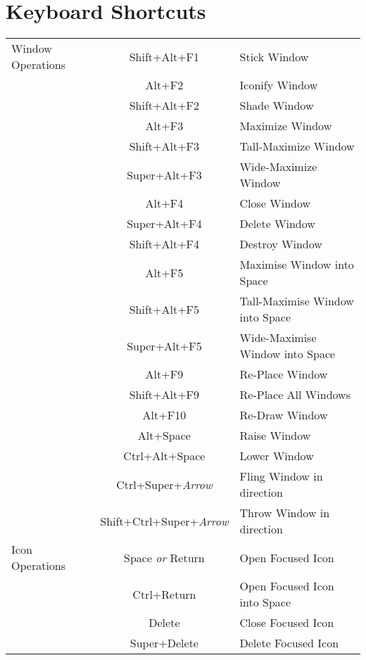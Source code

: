 \documentclass[a4paper,11pt]{article}
\begin{document}
	\section{Keyboard Shortcuts}
		\begin{longtable}{ l c l }
			\toprule
				Window Operations & Shift+Alt+F1 & Stick Window \\ \subrule
				                  & Alt+F2 & Iconify Window \\
				                  & Shift+Alt+F2 & Shade Window \\ \subrule
				                  & Alt+F3 & Maximize Window \\
				                  & Shift+Alt+F3 & Tall-Maximize Window \\
				                  & Super+Alt+F3 & Wide-Maximize Window \\ \subrule
				                  & Alt+F4 & Close Window \\
				                  & Super+Alt+F4 & Delete Window \\
				                  & Shift+Alt+F4 & Destroy Window \\ \subrule
				                  & Alt+F5 & Maximise Window into Space \\
				                  & Shift+Alt+F5 & Tall-Maximise Window into Space \\
				                  & Super+Alt+F5 & Wide-Maximise Window into Space \\ \subrule
				                  & Alt+F9 & Re-Place Window \\
				                  & Shift+Alt+F9 & Re-Place All Windows \\ \subrule
				                  & Alt+F10 & Re-Draw Window \\ \subrule
				                  & Alt+Space & Raise Window \\
				                  & Ctrl+Alt+Space & Lower Window \\ \subrule
				                  & Ctrl+Super+\emph{Arrow} & Fling Window in direction \\
				                  & Shift+Ctrl+Super+\emph{Arrow} & Throw Window in direction \\
			\midrule
				Icon Operations & Space \emph{or} Return & Open Focused Icon \\
				                & Ctrl+Return & Open Focused Icon into Space \\ \subrule
				                & Delete & Close Focused Icon \\
				                & Super+Delete & Delete Focused Icon \\

\end{longtable}
\end{document}
